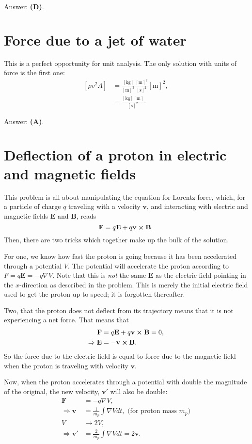 \documentclass[11pt]{paper}
\newcommand{\answer}[1]{Answer: \textbf{(#1)}.}
\newcommand{\units}[1]{\left[\text{#1}\right]}
\begin{document}
\answer{D}


\section{Force due to a jet of water}
This is a perfect opportunity for unit analysis.  The only solution with units of force is the first one:
\begin{align}
\left[\rho v^2 A\right] &= \frac{\units{kg}}{\units{m}^3} \frac{\units{m}^2}{\units{s}^2}\units{m}^2,\\
&= \frac{\units{kg}\units{m}}{\units{s}^2}.
\end{align}

\answer{A}

\section{Deflection of a proton in electric and magnetic fields}
This problem is all about manipulating the equation for Lorentz force, which, for a particle of charge $q$ traveling with a velocity $\mathbf{v}$, and interacting with electric and magnetic fields $\mathbf{E}$ and $\mathbf{B}$, reads
\begin{equation}
\mathbf{F} = q\mathbf{E}+q\mathbf{v} \cross \mathbf{B}.
\end{equation}
Then, there are two tricks which together make up the bulk of the solution.

For one, we know how fast the proton is going because it has been accelerated through a potential $V$.  The potential will accelerate the proton according to $F = q\mathbf{E} = -q\nabla V$.  Note that this is \emph{not} the same $\mathbf{E}$ as the electric field pointing in the $x$-direction as described in the problem.  This is merely the initial electric field used to get the proton up to speed; it is forgotten thereafter.

Two, that the proton does not deflect from its trajectory means that it is not experiencing a net force.  That means that
\begin{align}
\mathbf{F} &= q\mathbf{E}+q\mathbf{v} \cross \mathbf{B} = 0,\\
\Rightarrow \mathbf{E} &= -\mathbf{v} \cross \mathbf{B}.
\end{align}
So the force due to the electric field is equal to force due to the magnetic field when the proton is traveling with velocity $\mathbf{v}$.

Now, when the proton accelerates through a potential with double the magnitude of the original, the new velocity, $\mathbf{v}'$ will also be double:
\begin{align}
\mathbf{F} &= -q\nabla V,\\
\Rightarrow \mathbf{v} &= \frac{1}{m_p} \int \nabla V dt, \text{ (for proton mass $m_p$)}\\
V &\rightarrow 2V,\\
\Rightarrow \mathbf{v}' &= \frac{2}{m_p} \int \nabla V dt = 2\mathbf{v}.
\end{align}
\end{document}
